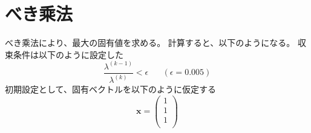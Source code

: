 \documentclass[a4j,twoside,openright,11pt]{jsarticle}
\begin{document}
\section{べき乘法}
べき乘法により、最大の固有値を求める。
計算すると、以下のようになる。
収束条件は以下のように設定した
\begin{equation}
\frac{\lambda^{(k-1)}}{\lambda^{(k)}}<\epsilon\;\;\;\;\;\;(\epsilon=0.005)
\end{equation}
初期設定として、固有ベクトルを以下のように仮定する
\begin{equation}
\bm{x}=
  \left(
    \begin{array}{r}
      1 \\
      1 \\
      1 \\
    \end{array}
  \right)
\end{equation}
\end{document}
